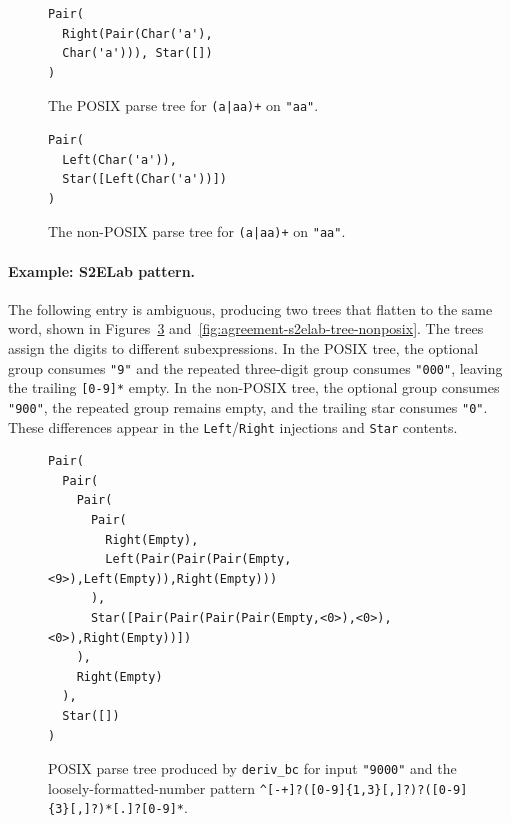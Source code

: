 %

\begin{figure}[H]
\centering
\small
\begin{verbatim}
Pair(
  Right(Pair(Char('a'), 
  Char('a'))), Star([])
)
\end{verbatim}
\caption{The POSIX parse tree for \texttt{(a|aa)+} on \texttt{"aa"}.}
\label{fig:agreement-synthetic-tree-posix}
\end{figure}

%

\begin{figure}[H]
\centering
\small
\begin{verbatim}
Pair(
  Left(Char('a')), 
  Star([Left(Char('a'))])
)
\end{verbatim}
\caption{The non-POSIX parse tree for \texttt{(a|aa)+} on \texttt{"aa"}.}
\label{fig:agreement-synthetic-tree-nonposix}
\end{figure}

%
%
%

\clearpage
\paragraph{Example: S2ELab pattern.} 
The following entry is ambiguous, producing two trees that
flatten to the same word, shown in
Figures~\ref{fig:agreement-s2elab-tree-posix}
and~\ref{fig:agreement-s2elab-tree-nonposix}.
The trees assign the digits to different
subexpressions.
In the POSIX tree, the optional group consumes
\texttt{"9"} and the repeated three-digit group
consumes \texttt{"000"}, leaving the trailing
\texttt{[0-9]*} empty.
In the non-POSIX tree, the optional group
consumes \texttt{"900"}, the repeated group
remains empty, and the trailing star consumes
\texttt{"0"}.
These differences appear in the
\texttt{Left}/\texttt{Right} injections
and \texttt{Star} contents.

%

\begin{figure}[H]
\centering
\small
\begin{verbatim}
Pair(
  Pair(
    Pair(
      Pair(
        Right(Empty),
        Left(Pair(Pair(Pair(Empty,<9>),Left(Empty)),Right(Empty)))
      ),
      Star([Pair(Pair(Pair(Pair(Empty,<0>),<0>),<0>),Right(Empty))])
    ),
    Right(Empty)
  ),
  Star([])
)
\end{verbatim}
\caption{POSIX parse tree produced by \texttt{deriv\_bc}
for input \texttt{"9000"} and the loosely-formatted-number pattern
\texttt{\textasciicircum[-+]?([0-9]\{1,3\}[,]?)?([0-9]\{3\}[,]?)*[.]?[0-9]*\textdollar}.}
\label{fig:agreement-s2elab-tree-posix}
\end{figure}

